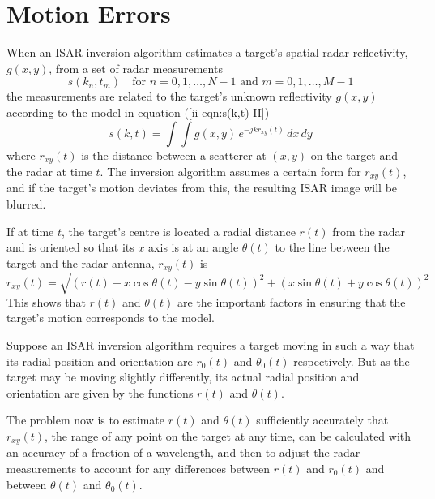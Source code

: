 \section{Motion Errors}

When an ISAR inversion algorithm estimates a target's spatial radar 
reflectivity, $g(x,y)$, from a set of radar measurements 
\begin{equation}
s(k_n,t_m)\quad\mbox{for $n=0,1,\ldots,N-1$ and $m=0,1,\ldots,M-1$}
\end{equation}
the measurements are related to the target's unknown reflectivity $g(x,y)$ 
according to the model in equation (\ref{ii eqn:s(k,t) II})
\begin{equation}
s(k,t)=\int\!\!\int g(x,y)\,e^{-jkr_{xy}(t)}\,dx\,dy
\end{equation}
where $r_{xy}(t)$ is the distance between a scatterer at $(x,y)$ on the
target and the radar at time $t$.  The inversion algorithm assumes a 
certain form for $r_{xy}(t)$, and if the target's motion deviates from this,
the resulting ISAR image will be blurred.

If at time $t$, the target's centre is located a radial distance $r(t)$ from
the radar and is oriented so that its $x$ axis is at an angle $\theta(t)$
to the line between the target and the radar antenna, $r_{xy}(t)$ is
\begin{equation}\label{mc eqn:rxy(t)}
r_{xy}(t)=\sqrt{\left(r(t)+x\cos\theta(t)-y\sin\theta(t)\right)^2
+\left(x\sin\theta(t)+y\cos\theta(t)\right)^2}
\end{equation}
This shows that $r(t)$ and $\theta(t)$ are the important factors in ensuring
that the target's motion corresponds to the model.  

Suppose an ISAR inversion algorithm requires a target moving in such a way
that its radial position and orientation are $r_0(t)$ and $\theta_0(t)$ 
respectively.  But as the target may be moving slightly differently, its
actual radial position and orientation are given by the functions $r(t)$
and $\theta(t)$.  

The problem now is to estimate $r(t)$ and $\theta(t)$ sufficiently
accurately that $r_{xy}(t)$, the range of any point on the target at any
time, can be calculated with an accuracy of a fraction of a wavelength, and
then to adjust the radar measurements to account for any differences between
$r(t)$ and $r_0(t)$ and between $\theta(t)$ and $\theta_0(t)$.

